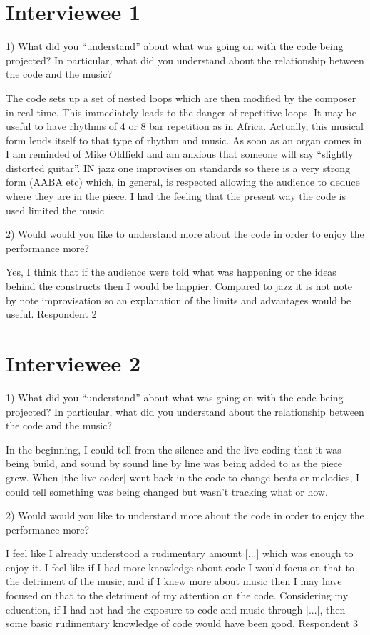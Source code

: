 \section*{Interviewee 1}
1) What did you ``understand'' about what was going on with the code being projected? In particular, what did you understand about the relationship between the code and the music?

The code sets up a set of nested loops which are then modified by the composer in real time. This immediately leads to the danger of repetitive loops. It may be useful to have rhythms of 4 or 8 bar repetition as in Africa. Actually, this musical form lends itself to that type of rhythm and music. As soon as an organ comes in I am reminded of Mike Oldfield and am anxious that someone will say “slightly distorted guitar”. IN jazz one improvises on standards so there is a very strong form (AABA etc) which, in general, is respected allowing the audience to deduce where they are in the piece. I had the feeling that the present way the code is used limited the music

2) Would would you like to understand more about the code in order to enjoy the performance more?

Yes, I think that if the audience were told what was happening or the ideas behind the constructs then I would be happier. Compared to jazz it is not note by note improvisation so an explanation of the limits and advantages would be useful.
Respondent 2

\section*{Interviewee 2}

1) What did you ``understand'' about what was going on with the code being projected? In particular, what did you understand about the relationship between the code and the music?

In the beginning, I could tell from the silence and the live coding that it was being build, and sound by sound line by line was being added to as the piece grew.  When [the live coder] went back in the code to change beats or melodies, I could tell something was being changed but wasn't tracking what or how.

2) Would would you like to understand more about the code in order to enjoy the performance more?

I feel like I already understood a rudimentary amount [...] which was enough to enjoy it.  I feel like if I had more knowledge about code I would focus on that to the detriment of the music; and if I knew more about music then I may have focused on that to the detriment of my attention on the code.  Considering my education, if I had not had the exposure to code and music through [...], then some basic rudimentary knowledge of code would have been good.
Respondent 3

